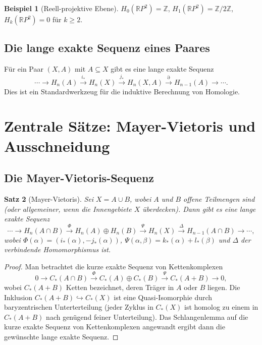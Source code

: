 \documentclass[12pt,a4paper]{amsart}
\newtheorem{theorem}{Satz}[section]
\theoremstyle{definition}
\newtheorem{example}[theorem]{Beispiel}
\begin{document}
\begin{example}[Reell-projektive Ebene]
$H_0(\mathbb{R}P^2) = \mathbb{Z}$,
$H_1(\mathbb{R}P^2) = \mathbb{Z}/2\mathbb{Z}$,
$H_k(\mathbb{R}P^2) = 0$ f\"ur $k \geq 2$.
\end{example}

\subsection{Die lange exakte Sequenz eines Paares}

F\"ur ein Paar $(X, A)$ mit $A \subseteq X$ gibt es eine lange exakte Sequenz
\[
  \cdots \to H_n(A) \xrightarrow{i_*} H_n(X)
  \xrightarrow{j_*} H_n(X, A)
  \xrightarrow{\partial} H_{n-1}(A) \to \cdots.
\]
Dies ist ein Standardwerkzeug f\"ur die induktive Berechnung von Homologie.

\section{Zentrale S\"atze: Mayer-Vietoris und Ausschneidung}
\label{sec:schluessel}

\subsection{Die Mayer-Vietoris-Sequenz}

\begin{theorem}[Mayer-Vietoris]
\label{thm:mayer_vietoris}
Sei $X = A \cup B$, wobei $A$ und $B$ offene Teilmengen sind (oder allgemeiner,
wenn die Innengebiete $X$ \"uberdecken). Dann gibt es eine lange exakte Sequenz
\[
  \cdots \to H_n(A \cap B)
  \xrightarrow{\Phi} H_n(A) \oplus H_n(B)
  \xrightarrow{\Psi} H_n(X)
  \xrightarrow{\Delta} H_{n-1}(A \cap B) \to \cdots,
\]
wobei $\Phi(\alpha) = (i_*(\alpha), -j_*(\alpha))$,
$\Psi(\alpha, \beta) = k_*(\alpha) + l_*(\beta)$ und $\Delta$ der
verbindende Homomorphismus ist.
\end{theorem}
\begin{proof}
Man betrachtet die kurze exakte Sequenz von Kettenkomplexen
\[
  0 \to C_*(A \cap B) \xrightarrow{\Phi} C_*(A) \oplus C_*(B)
  \xrightarrow{\Psi} C_*(A+B) \to 0,
\]
wobei $C_*(A+B)$ Ketten bezeichnet, deren Tr\"ager in $A$ oder $B$ liegen.
Die Inklusion $C_*(A+B) \hookrightarrow C_*(X)$ ist eine Quasi-Isomorphie
durch baryzentrischen Unterterteilung (jeder Zyklus in $C_*(X)$ ist
homolog zu einem in $C_*(A+B)$ nach gen\"ugend feiner Unterteilung).
Das Schlangenlemma auf die kurze exakte Sequenz von Kettenkomplexen
angewandt ergibt dann die gew\"unschte lange exakte Sequenz.
\end{proof}
\end{document}
